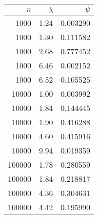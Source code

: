 \begin{tabular}{rrr}
\toprule
    $n$ &  $\lambda$ &    $\psi$ \\
\midrule
   1000 &       1.24 &  0.003290 \\
   1000 &       1.30 &  0.111582 \\
   1000 &       2.68 &  0.777452 \\
   1000 &       6.46 &  0.002152 \\
   1000 &       6.52 &  0.105525 \\
  10000 &       1.00 &  0.003992 \\
  10000 &       1.84 &  0.144445 \\
  10000 &       1.90 &  0.416288 \\
  10000 &       4.60 &  0.415916 \\
  10000 &       9.94 &  0.019359 \\
 100000 &       1.78 &  0.280559 \\
 100000 &       1.84 &  0.218817 \\
 100000 &       4.36 &  0.304631 \\
 100000 &       4.42 &  0.195990 \\
\bottomrule
\end{tabular}

